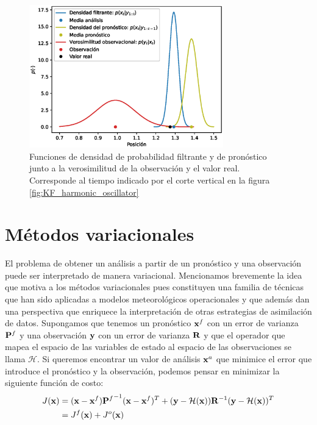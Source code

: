 \begin{figure}[h!]
    \centering
    \includegraphics[width=0.75\textwidth]{example_codes/KF_bayes.eps}
    \caption{Funciones de densidad de probabilidad filtrante y de pronóstico junto a la verosimilitud de la observación y el valor real. Corresponde al tiempo indicado por el corte vertical en la figura \ref{fig:KF_harmonic_oscillator}}
    \label{fig:KF_bayes}
\end{figure}

\section{Métodos variacionales}

El problema de obtener un análisis a partir de un pronóstico y una observación puede ser interpretado de manera variacional. Mencionamos brevemente la idea que motiva a los métodos variacionales pues constituyen una familia de técnicas que han sido aplicadas a modelos meteorológicos operacionales y que además dan una perspectiva que enriquece la interpretación de otras estrategias de asimilación de datos. Supongamos que tenemos un pronóstico $\mathbf{x}^f$ con un error de varianza $\mathbf{P}^f$ y una observación $\mathbf{y}$ con un error de varianza $\mathbf{R}$ y que el operador que mapea el espacio de las variables de estado al espacio de las observaciones se llama $\mathcal{H}$. Si queremos encontrar un valor de análisis $\mathbf{x}^a$ que minimice el error que introduce el pronóstico y la observación, podemos pensar en minimizar la siguiente función de costo:
\begin{align}
    J(\mathbf{x}) &= (\mathbf{x} - \mathbf{x}^f) {\mathbf{P}^f}^{-1} (\mathbf{x} - \mathbf{x}^f)^T + (\mathbf{y} - \mathcal{H} (\mathbf{x})) \mathbf{R}^{-1} (\mathbf{y} - \mathcal{H} (\mathbf{x}))^T \label{eq:3dvar_cost} \\
    &= J^f(\mathbf{x}) + J^o(\mathbf{x})
\end{align}

